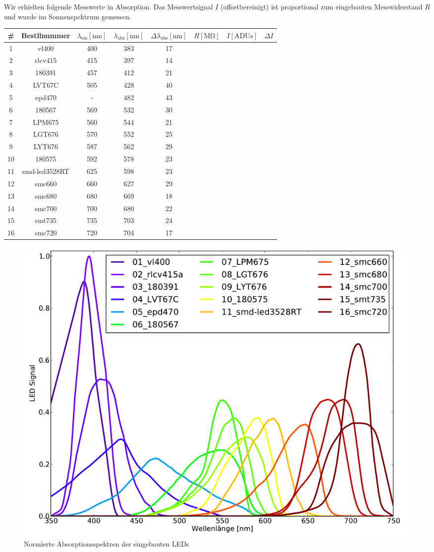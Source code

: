 \documentclass[a4paper, 12pt]{scrartcl}
\begin{document}
Wir erhielten folgende Messwerte in Absorption.
Das Messwertsignal $I$ (offsetbereinigt) ist proportional zum eingebauten Messwiderstand $R$ und wurde im Sonnenspektrum gemessen.

{\centering
\begin{tabular}{c|c|c|c|c|c|c|c}
\# &
Bestllnummer &
$\lambda_\text{em} [\mathrm{nm}]$ &
$\lambda_\text{abs} [\mathrm{nm}]$ &
$\Delta\lambda_\text{abs} [\mathrm{nm}]$ &
$R [\mathrm{M\Omega}]$ &
$I [\text{ADUs}]$ &
$\Delta I$\\
\hline
1 & vl400 & 400 & 383 & 17\\
2 & rlcv415 & 415 & 397 & 14\\
3 & 180391 & 457 & 412 & 21\\
4 & LVT67C & 505 & 428 & 40\\
5 & epd470 & - & 482 & 43\\
6 & 180567 & 569 & 532 & 30\\
7 & LPM675 & 560 & 544 & 21\\
8 & LGT676 & 570 & 552 & 25\\
9 & LYT676 & 587 & 562 & 29\\
10 & 180575 & 592 & 578 & 23\\
11 & smd-led3528RT & 625 & 598 & 23\\
12 & smc660 & 660 & 627 & 29\\
13 & smc680 & 680 & 669 & 18\\
14 & smc700 & 700 & 680 & 22\\
15 & smt735 & 735 & 703 & 24\\
16 & smc720 & 720 & 704 & 17\\
\end{tabular}}

\begin{figure}[ht]
\centering
\includegraphics[width=\textwidth]{images/spektren.pdf}
\caption{Normierte Absorptionsspektren der eingebauten LEDs}
\end{figure}
\end{document}
